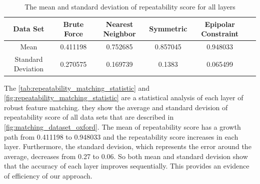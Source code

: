\begin{table}[H]
\centering
  \begin{tabular}{| c || c | c | c | c | c |}
      \hline
      Data Set & Brute Force & Nearest Neighbor & Symmetric & Epipolar Constraint \\ \hline \hline
      Mean & 0.411198 & 0.752685 & 0.857045 & 0.948033 \\  \hline
      Standard Deviation & 0.270575 & 0.169739 & 0.1383 & 0.065499 \\  \hline
  \end{tabular}
  \caption{The mean and standard deviation of repeatability score for all layers} \label{tab:repeatability_matching_statistic}
\end{table}

The \autoref{tab:repeatability_matching_statistic} and \autoref{fig:repeatability_matching_statistic} are a statistical analysis of each layer of robust feature matching. they show the average and standard devision of repeatability score of all data sets that are described in \autoref{fig:matching_dataset_oxford}. The mean of repeatability score has a growth path from 0.411198 to 0.948033 and the repeatability score increases in each layer. Furthermore, the standard devision, which represents the error around the average, decreases from 0.27 to 0.06. So both mean and standard devision show that the accuracy of each layer improves sequentially. This provides an evidence of efficiency of our approach.